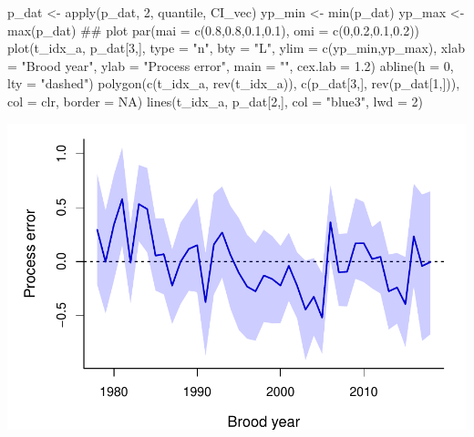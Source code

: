 \documentclass[
  11pt,
]{article}
\newenvironment{Shaded}{}{}
\newcommand{\CommentTok}[1]{\textcolor[rgb]{0.00,0.50,0.00}{#1}}
\newcommand{\DataTypeTok}[1]{#1}
\newcommand{\DecValTok}[1]{#1}
\newcommand{\FloatTok}[1]{#1}
\newcommand{\KeywordTok}[1]{\textcolor[rgb]{0.00,0.00,1.00}{#1}}
\newcommand{\NormalTok}[1]{#1}
\newcommand{\OtherTok}[1]{\textcolor[rgb]{1.00,0.25,0.00}{#1}}
\newcommand{\StringTok}[1]{\textcolor[rgb]{0.00,0.50,0.50}{#1}}
\begin{document}
\begin{Shaded}
\begin{Highlighting}[]
\NormalTok{p_dat <-}\StringTok{ }\KeywordTok{apply}\NormalTok{(p_dat, }\DecValTok{2}\NormalTok{, quantile, CI_vec)}
\NormalTok{yp_min <-}\StringTok{ }\KeywordTok{min}\NormalTok{(p_dat)}
\NormalTok{yp_max <-}\StringTok{ }\KeywordTok{max}\NormalTok{(p_dat)}
\CommentTok{## plot}
\KeywordTok{par}\NormalTok{(}\DataTypeTok{mai =} \KeywordTok{c}\NormalTok{(}\FloatTok{0.8}\NormalTok{,}\FloatTok{0.8}\NormalTok{,}\FloatTok{0.1}\NormalTok{,}\FloatTok{0.1}\NormalTok{), }\DataTypeTok{omi =} \KeywordTok{c}\NormalTok{(}\DecValTok{0}\NormalTok{,}\FloatTok{0.2}\NormalTok{,}\FloatTok{0.1}\NormalTok{,}\FloatTok{0.2}\NormalTok{))}
\KeywordTok{plot}\NormalTok{(t_idx_a, p_dat[}\DecValTok{3}\NormalTok{,],}
     \DataTypeTok{type =} \StringTok{"n"}\NormalTok{,  }\DataTypeTok{bty =} \StringTok{"L"}\NormalTok{,}
     \DataTypeTok{ylim =} \KeywordTok{c}\NormalTok{(yp_min,yp_max),}
     \DataTypeTok{xlab =} \StringTok{"Brood year"}\NormalTok{, }\DataTypeTok{ylab =} \StringTok{"Process error"}\NormalTok{, }\DataTypeTok{main =} \StringTok{""}\NormalTok{,}
     \DataTypeTok{cex.lab =} \FloatTok{1.2}\NormalTok{)}
\KeywordTok{abline}\NormalTok{(}\DataTypeTok{h =} \DecValTok{0}\NormalTok{, }\DataTypeTok{lty =} \StringTok{"dashed"}\NormalTok{)}
\KeywordTok{polygon}\NormalTok{(}\KeywordTok{c}\NormalTok{(t_idx_a, }\KeywordTok{rev}\NormalTok{(t_idx_a)), }\KeywordTok{c}\NormalTok{(p_dat[}\DecValTok{3}\NormalTok{,], }\KeywordTok{rev}\NormalTok{(p_dat[}\DecValTok{1}\NormalTok{,])),}
        \DataTypeTok{col =}\NormalTok{ clr, }\DataTypeTok{border =} \OtherTok{NA}\NormalTok{)}
\KeywordTok{lines}\NormalTok{(t_idx_a, p_dat[}\DecValTok{2}\NormalTok{,], }\DataTypeTok{col =} \StringTok{"blue3"}\NormalTok{, }\DataTypeTok{lwd =} \DecValTok{2}\NormalTok{)}
\end{Highlighting}
\end{Shaded}

\begin{center}\includegraphics{App_3_Summarize_results_forecast_2020_2021_files/figure-latex/fig_5_proc_err-1} \end{center}
\end{document}
